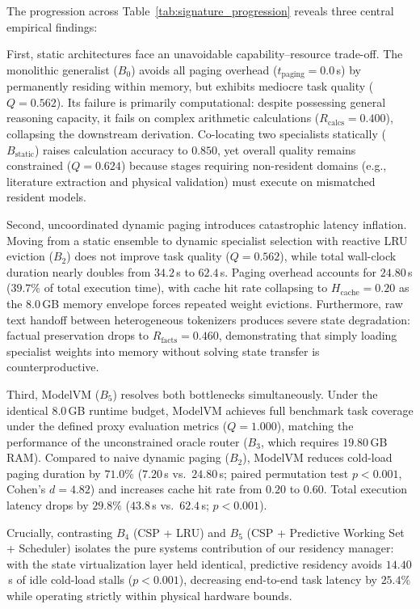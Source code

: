 The progression across Table~\ref{tab:signature_progression} reveals three central empirical findings:

First, static architectures face an unavoidable capability--resource trade-off. The monolithic generalist ($B_0$) avoids all paging overhead ($t_{\text{paging}} = 0.0$\,s) by permanently residing within memory, but exhibits mediocre task quality ($Q = 0.562$). Its failure is primarily computational: despite possessing general reasoning capacity, it fails on complex arithmetic calculations ($R_{\text{calcs}} = 0.400$), collapsing the downstream derivation. Co-locating two specialists statically ($B_{\text{static}}$) raises calculation accuracy to $0.850$, yet overall quality remains constrained ($Q = 0.624$) because stages requiring non-resident domains (e.g., literature extraction and physical validation) must execute on mismatched resident models.

Second, uncoordinated dynamic paging introduces catastrophic latency inflation. Moving from a static ensemble to dynamic specialist selection with reactive LRU eviction ($B_2$) does not improve task quality ($Q = 0.562$), while total wall-clock duration nearly doubles from $34.2$\,s to $62.4$\,s. Paging overhead accounts for $24.80$\,s ($39.7\%$ of total execution time), with cache hit rate collapsing to $H_{\text{cache}} = 0.20$ as the 8.0\,GB memory envelope forces repeated weight evictions. Furthermore, raw text handoff between heterogeneous tokenizers produces severe state degradation: factual preservation drops to $R_{\text{facts}} = 0.460$, demonstrating that simply loading specialist weights into memory without solving state transfer is counterproductive.

Third, ModelVM ($B_5$) resolves both bottlenecks simultaneously. Under the identical 8.0\,GB runtime budget, ModelVM achieves full benchmark task coverage under the defined proxy evaluation metrics ($Q = 1.000$), matching the performance of the unconstrained oracle router ($B_3$, which requires $19.80$\,GB RAM). Compared to naive dynamic paging ($B_2$), ModelVM reduces cold-load paging duration by $71.0\%$ ($7.20$\,s vs.\ $24.80$\,s; paired permutation test $p < 0.001$, Cohen's $d = 4.82$) and increases cache hit rate from $0.20$ to $0.60$. Total execution latency drops by $29.8\%$ ($43.8$\,s vs.\ $62.4$\,s; $p < 0.001$). 

Crucially, contrasting $B_4$ (CSP + LRU) and $B_5$ (CSP + Predictive Working Set + Scheduler) isolates the pure systems contribution of our residency manager: with the state virtualization layer held identical, predictive residency avoids $14.40$\,s of idle cold-load stalls ($p < 0.001$), decreasing end-to-end task latency by $25.4\%$ while operating strictly within physical hardware bounds.

